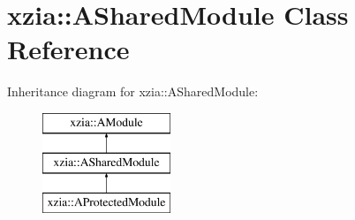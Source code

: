 \hypertarget{classxzia_1_1ASharedModule}{}\section{xzia\+:\+:A\+Shared\+Module Class Reference}
\label{classxzia_1_1ASharedModule}
Inheritance diagram for xzia\+:\+:A\+Shared\+Module\+:\begin{figure}[H]
\begin{center}
\leavevmode
\includegraphics[height=3.000000cm]{classxzia_1_1ASharedModule}
\end{center}
\end{figure}
